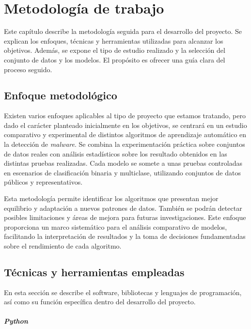 \chapter{Metodología de trabajo}
\label{ch:metodologia}

Este capítulo describe la metodología seguida para el desarrollo del proyecto. Se explican los enfoques, técnicas y herramientas utilizadas para alcanzar los objetivos. Además, se expone el tipo de estudio realizado y la selección del conjunto de datos y los modelos. El propósito es ofrecer una guía clara del proceso seguido.

\section{Enfoque metodológico}
\label{sec:enfoque}

Existen varios enfoques aplicables al tipo de proyecto que estamos tratando, pero dado el carácter planteado inicialmente en los objetivos, se centrará en un estudio comparativo y experimental de distintos algoritmos de aprendizaje automático en la detección de \textit{malware}. Se combina la experimentación práctica sobre conjuntos de datos reales con análisis estadísticos sobre los resultado obtenidos en las distintas pruebas realizadas. Cada modelo se somete a unas pruebas controladas en escenarios de clasificación binaria y multiclase, utilizando conjuntos de datos públicos y representativos.

\vspace{1em}

Esta metodología permite identificar los algoritmos que presentan mejor equilibrio y adaptación a nuevos patrones de datos. También se podrán detectar posibles limitaciones y áreas de mejora para futuras investigaciones. Este enfoque proporciona un marco sistemático para el análisis comparativo de modelos, facilitando la interpretación de resultados y la toma de decisiones fundamentadas sobre el rendimiento de cada algoritmo.

\section{Técnicas y herramientas empleadas}
\label{sec:herramientas}

En esta sección se describe el software, bibliotecas y lenguajes de programación, así como su función específica dentro del desarrollo del proyecto.

\subsubsection{\textit{Python}}
\label{subsubsec:python}


